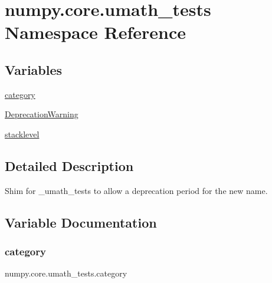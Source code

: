 \hypertarget{namespacenumpy_1_1core_1_1umath__tests}{}\section{numpy.\+core.\+umath\+\_\+tests Namespace Reference}
\label{namespacenumpy_1_1core_1_1umath__tests}
\subsection*{Variables}
\begin{DoxyCompactItemize}
\item 
\hyperlink{namespacenumpy_1_1core_1_1umath__tests_abde64c5cb4a503f881b9282f676c3c17}{category}
\item 
\hyperlink{namespacenumpy_1_1core_1_1umath__tests_a5db09e342a59984d850e34d01cf0252a}{Deprecation\+Warning}
\item 
\hyperlink{namespacenumpy_1_1core_1_1umath__tests_aca65a5a92b19bf51ec3a40e582ceeaf1}{stacklevel}
\end{DoxyCompactItemize}


\subsection{Detailed Description}
\begin{DoxyVerb}Shim for _umath_tests to allow a deprecation period for the new name.\end{DoxyVerb}
 

\subsection{Variable Documentation}
\mbox{\label{namespacenumpy_1_1core_1_1umath__tests_abde64c5cb4a503f881b9282f676c3c17}} 
\subsubsection{\texorpdfstring{category}{category}}
{\footnotesize\ttfamily numpy.\+core.\+umath\+\_\+tests.\+category}

\mbox{\label{namespacenumpy_1_1core_1_1umath__tests_a5db09e342a59984d850e34d01cf0252a}} 
